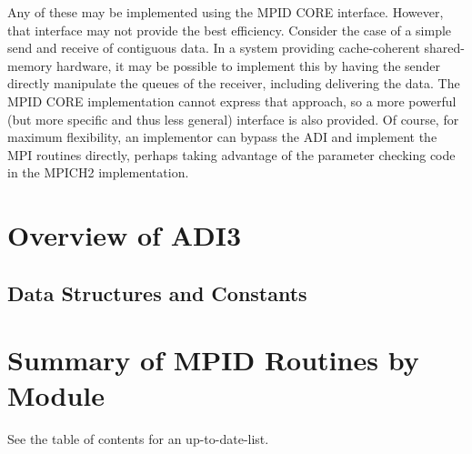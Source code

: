\documentclass{article}
\begin{document}
Any of these may be implemented using the MPID CORE interface.
However, that interface may not provide the best efficiency.  Consider
the case of a simple send and receive of contiguous data.  In a system
providing cache-coherent shared-memory hardware, it may be possible to
implement this by having the sender directly manipulate the queues of
the receiver, including delivering the data.  The MPID CORE
implementation cannot express that approach, so a more powerful (but
more specific and thus less general) interface is also provided.  Of
course, for maximum flexibility, an implementor can bypass the ADI and
implement the MPI routines directly, perhaps taking advantage of the
parameter checking code in the MPICH2 implementation.

\mancontentstrue

\section{Overview of ADI3}



\subsection{Data Structures and Constants}

%
%

\section{Summary of MPID Routines by Module}

See the table of contents for an up-to-date-list.

\end{document}
